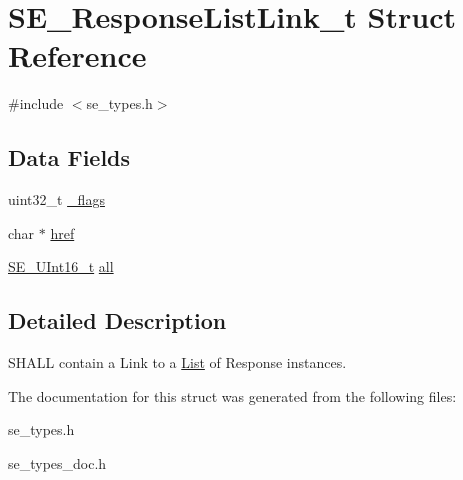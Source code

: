 \hypertarget{structSE__ResponseListLink__t}{}\section{S\+E\+\_\+\+Response\+List\+Link\+\_\+t Struct Reference}
\label{structSE__ResponseListLink__t}


{\ttfamily \#include $<$se\+\_\+types.\+h$>$}

\subsection*{Data Fields}
\begin{DoxyCompactItemize}
\item 
uint32\+\_\+t \hyperlink{group__ResponseListLink_ga54194415a4458904a89ba172148b82e8}{\+\_\+flags}
\item 
char $\ast$ \hyperlink{group__ResponseListLink_ga48bb0add8ae3c93f524b731f596f1343}{href}
\item 
\hyperlink{group__UInt16_gac68d541f189538bfd30cfaa712d20d29}{S\+E\+\_\+\+U\+Int16\+\_\+t} \hyperlink{group__ResponseListLink_ga5cf19fe8f4b95dc44ce8305d28fb9fd8}{all}
\end{DoxyCompactItemize}


\subsection{Detailed Description}
S\+H\+A\+LL contain a Link to a \hyperlink{structList}{List} of Response instances. 

The documentation for this struct was generated from the following files\+:\begin{DoxyCompactItemize}
\item 
se\+\_\+types.\+h\item 
se\+\_\+types\+\_\+doc.\+h\end{DoxyCompactItemize}
